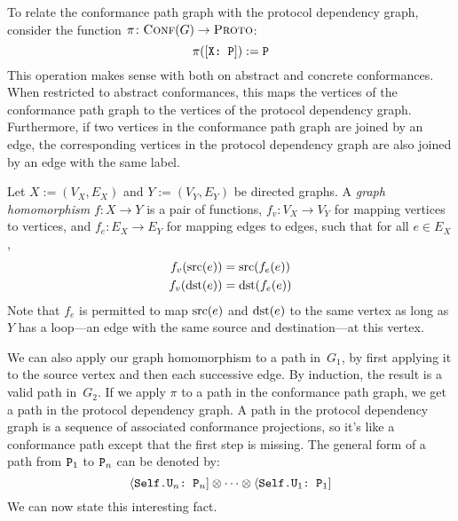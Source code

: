 \documentclass[../generics]{subfiles}
\begin{document}
To relate the conformance path graph with the protocol dependency graph, consider the function $\pi\colon\textsc{Conf}({G})\rightarrow\textsc{Proto}$:
\[\pi([\texttt{X:~P}]):=\texttt{P}\]
This operation makes sense with both on abstract and concrete conformances. When restricted to abstract conformances, this maps the vertices of the conformance path graph to the vertices of the protocol dependency graph. Furthermore, if two vertices in the conformance path graph are joined by an edge, the corresponding vertices in the protocol dependency graph are also joined by an edge with the same label.

\begin{definition}
Let $X:=(V_X,E_X)$ and $Y:=(V_Y,E_Y)$ be directed graphs. A \emph{graph homomorphism} $f\colon X\rightarrow Y$ is a pair of functions, $f_v\colon V_X\rightarrow V_Y$ for mapping vertices to vertices, and $f_e\colon E_X\rightarrow E_Y$ for mapping edges to edges, such that for all $e\in E_X$,
\begin{gather*}
f_v(\operatorname{src}(e)) = \operatorname{src}(f_e(e))\\
f_v(\operatorname{dst}(e)) = \operatorname{dst}(f_e(e))
\end{gather*}
Note that $f_e$ is permitted to map $\operatorname{src}(e)$ and $\operatorname{dst}(e)$ to the same vertex as long as $Y$ has a loop---an edge with the same source and destination---at this vertex.
\end{definition}

We can also apply our graph homomorphism to a path in~$G_1$, by first applying it to the source vertex and then each successive edge. By induction, the result is a valid path in~$G_2$. If we apply $\pi$ to a path in the conformance path graph, we get a path in the protocol dependency graph. A path in the protocol dependency graph is a sequence of associated conformance projections, so it's like a conformance path except that the first step is missing. The general form of a path from $\texttt{P}_1$ to $\texttt{P}_n$ can be denoted by:
\[\langle\texttt{Self.$\texttt{U}_n$:~$\texttt{P}_n$}] \otimes \cdots \otimes \langle\texttt{Self.$\texttt{U}_1$:~$\texttt{P}_1$}]\]
We can now state this interesting fact.
\end{document}
